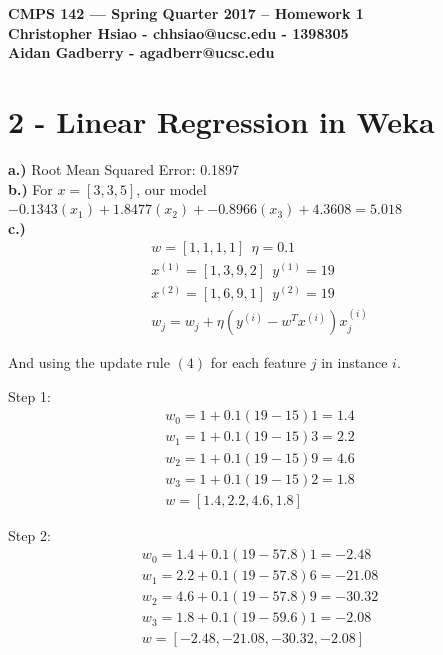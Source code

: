 \documentclass[11pt]{article}
\begin{document}
\begin{center}
{\bf\Large CMPS 142 --- Spring Quarter 2017 --  Homework 1}\\
{\bf Christopher Hsiao - chhsiao@ucsc.edu - 1398305}\\
{\bf Aidan Gadberry - agadberr@ucsc.edu}
\end{center}

\section*{2 - Linear Regression in Weka}
\textbf{a.)} Root Mean Squared Error: 0.1897\\
\textbf{b.)} For $x = [3, 3, 5]$, our model $-0.1343(x_1) + 1.8477(x_2) + -0.8966(x_3) + 4.3608 = 5.018$\\
\textbf{c.)}
\begin{align}
w = [1, 1, 1, 1] \ \ \eta = 0.1 \\ 
x^{(1)} = [1, 3, 9, 2] \ \ y^{(1)} = 19 \\
x^{(2)} = [1, 6, 9, 1] \ \ y^{(2)} = 19 \\
w_j = w_j + \eta(y^{(i)} - w^Tx^{(i)})x^{(i)}_j
\end{align}
\begin{center}
And using the update rule $(4)$ for each feature $j$ in instance $i$.
\end{center}

Step 1: 
\begin{align*}
w_0 = 1 + 0.1(19 - 15)1 = 1.4\\
w_1 = 1 + 0.1(19 - 15)3 = 2.2\\
w_2 = 1 + 0.1(19 - 15)9 = 4.6\\
w_3 = 1 + 0.1(19 - 15)2 = 1.8\\
w = [1.4, 2.2, 4.6, 1.8]
\end{align*}

Step 2:
\begin{align*}
w_0 = 1.4 + 0.1(19 - 57.8)1 = -2.48\\
w_1 = 2.2 + 0.1(19 - 57.8)6 = -21.08\\
w_2 = 4.6 + 0.1(19 - 57.8)9 = -30.32\\
w_3 = 1.8 + 0.1(19 - 59.6)1= -2.08\\
w = [-2.48, -21.08, -30.32, -2.08]
\end{align*}
\end{document}
